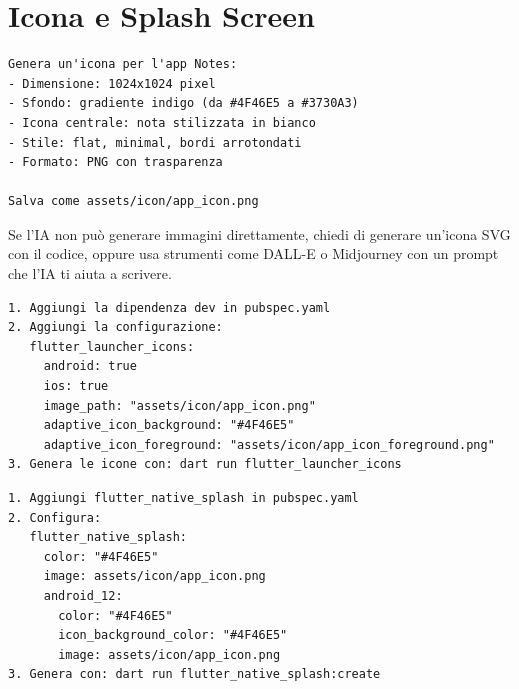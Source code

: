 \section{Icona e Splash Screen}

\begin{praticabox}[title={Pratica --- Genera l'icona con l'IA}]
\begin{lstlisting}[language={}]
Genera un'icona per l'app Notes:
- Dimensione: 1024x1024 pixel
- Sfondo: gradiente indigo (da #4F46E5 a #3730A3)
- Icona centrale: nota stilizzata in bianco
- Stile: flat, minimal, bordi arrotondati
- Formato: PNG con trasparenza

Salva come assets/icon/app_icon.png
\end{lstlisting}
\end{praticabox}

\begin{tipbox}
Se l'IA non può generare immagini direttamente, chiedi di generare un'icona SVG con il codice, oppure usa strumenti come DALL-E o Midjourney con un prompt che l'IA ti aiuta a scrivere.
\end{tipbox}

\begin{praticabox}[title={Pratica --- Configura flutter\_launcher\_icons}]
\begin{lstlisting}[language={}]
1. Aggiungi la dipendenza dev in pubspec.yaml
2. Aggiungi la configurazione:
   flutter_launcher_icons:
     android: true
     ios: true
     image_path: "assets/icon/app_icon.png"
     adaptive_icon_background: "#4F46E5"
     adaptive_icon_foreground: "assets/icon/app_icon_foreground.png"
3. Genera le icone con: dart run flutter_launcher_icons
\end{lstlisting}
\end{praticabox}

\begin{praticabox}[title={Pratica --- Splash Screen}]
\begin{lstlisting}[language={}]
1. Aggiungi flutter_native_splash in pubspec.yaml
2. Configura:
   flutter_native_splash:
     color: "#4F46E5"
     image: assets/icon/app_icon.png
     android_12:
       color: "#4F46E5"
       icon_background_color: "#4F46E5"
       image: assets/icon/app_icon.png
3. Genera con: dart run flutter_native_splash:create
\end{lstlisting}
\end{praticabox}

